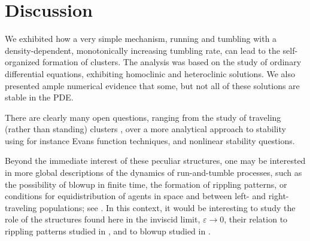 \documentclass[10pt]{article}
\newcommand{\eps}{\varepsilon}
\begin{document}
\section{Discussion} \label{section:discussion}

We exhibited how a very simple mechanism, running and tumbling with a density-dependent, monotonically increasing tumbling rate, can lead to the self-organized formation of clusters. The analysis was based on the study of ordinary differential equations, exhibiting homoclinic and heteroclinic solutions. We also presented ample numerical evidence that some, but not all of these solutions are stable in the PDE. 

There are clearly many open questions, ranging from the study of traveling (rather than standing) clusters \cite{fuhrmann}, over a more analytical approach to stability using for instance Evans function techniques, and nonlinear stability questions. 

Beyond the immediate interest of these peculiar structures, one may be interested in more global descriptions of the dynamics of run-and-tumble processes, such as the possibility of blowup in finite time, the formation of rippling patterns, or conditions for equidistribution of agents in space and between left- and right-traveling populations; see \cite{scheel2016wavenumber,kss}. 
In this context, it would be interesting to study the role of the structures found here in the inviscid limit, $\eps\to 0$, their relation to rippling patterns studied in \cite{scheel2016wavenumber}, and to blowup studied in \cite{kss}. 
\end{document}
